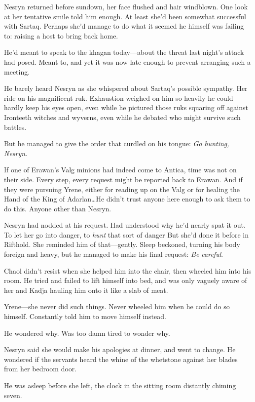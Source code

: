 Nesryn returned before sundown, her face flushed and hair windblown.
One look at her tentative smile told him enough.
At least she'd been somewhat successful with Sartaq.
Perhaps she'd manage to do what it seemed he himself was failing to: raising a host to bring back home.

He'd meant to speak to the khagan today---about the threat last night's attack had posed.
Meant to, and yet it was now late enough to prevent arranging such a meeting.

He barely heard Nesryn as she whispered about Sartaq's possible sympathy.
Her ride on his magnificent ruk.
Exhaustion weighed on him so heavily he could hardly keep his eyes open, even while he pictured those ruks squaring off against Ironteeth witches and wyverns, even while he debated who might survive such battles.

But he managed to give the order that curdled on his tongue: \emph{Go hunting, Nesryn}.

If one of Erawan's Valg minions had indeed come to Antica, time was not on their side.
Every step, every request might be reported back to Erawan.
And if they were pursuing Yrene, either for reading up on the Valg or for healing the Hand of the King of Adarlan\ldots He didn't trust anyone here enough to ask them to do this.
Anyone other than Nesryn.

Nesryn had nodded at his request.
Had understood why he'd nearly spat it out.
To let her go into danger, to \emph{hunt} that sort of danger 
But she'd done it before in Rifthold.
She reminded him of that---gently.
Sleep beckoned, turning his body foreign and heavy, but he managed to make his final request: \emph{Be careful}.

Chaol didn't resist when she helped him into the chair, then wheeled him into his room.
He tried and failed to lift himself into bed, and was only vaguely aware of her and Kadja hauling him onto it like a slab of meat.

Yrene---she never did such things.
Never wheeled him when he could do so himself.
Constantly told him to move himself instead.

He wondered why.
Was too damn tired to wonder why.

Nesryn said she would make his apologies at dinner, and went to change.
He wondered if the servants heard the whine of the whetstone against her blades from her bedroom door.

He was asleep before she left, the clock in the sitting room distantly chiming seven.

